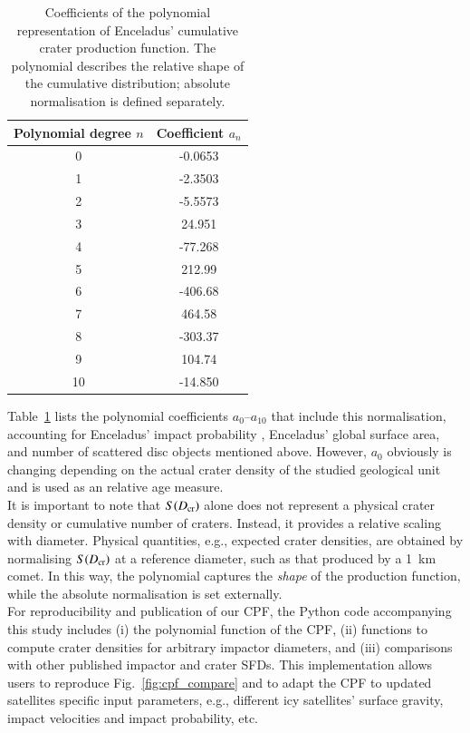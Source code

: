 \documentclass[preprint,11pt,3p,times,authoryear]{elsarticle}
\begin{document}
{\begin{table}[t]%
\centering
\begin{tabular}{cc}
\hline
\textbf{Polynomial degree $n$} & \textbf{Coefficient $a_n$} \\
\hline
0 & -0.0653  \\
1 & -2.3503 \\
2 & -5.5573 \\
3 & 24.951  \\
4 & -77.268 \\
5 & 212.99  \\
6 & -406.68 \\
7 & 464.58  \\
8 & -303.37 \\
9 & 104.74  \\
10 & -14.850 \\
\hline
\end{tabular}
\caption{Coefficients of the polynomial representation of Enceladus’ cumulative crater production function. The polynomial describes the relative shape of the cumulative distribution; absolute normalisation is defined separately.}
\label{tab:cpf}
\end{table}

Table~\ref{tab:cpf} lists the polynomial coefficients $a_{0}$–$a_{10}$ that include this normalisation, accounting for Enceladus’ impact probability \citep{Wong2023,Brasser2025}, Enceladus' global surface area, and number of scattered disc objects mentioned above. However, $a_{0}$ obviously is changing depending on the actual crater density of the studied geological unit and is used as an relative age measure.\\

It is important to note that $S(D_{\rm cr})$ alone does not represent a physical crater density or cumulative number of craters. Instead, it provides a relative scaling with diameter.
Physical quantities, e.g., expected crater densities, are obtained by normalising $S(D_{\rm cr})$ at a reference diameter, such as that produced by a 1~km comet.
In this way, the polynomial captures the \emph{shape} of the production function, while the absolute normalisation is set externally.\\

For reproducibility and publication of our CPF, the Python code accompanying this study includes (i) the polynomial function of the CPF, (ii) functions to compute crater densities for arbitrary impactor diameters, and (iii) comparisons with other published impactor and crater SFDs. This implementation allows users to reproduce Fig.~\ref{fig:cpf_compare} and to adapt the CPF to updated satellites specific input parameters, e.g., different icy satellites' surface gravity, impact velocities and impact probability, etc.\\

}
\end{document}

